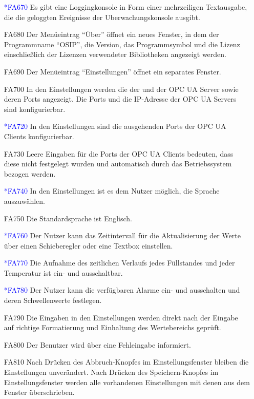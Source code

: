 \documentclass[parskip=full]{scrartcl}
\begin{document}
\begin{enumerate}
  \item[\textcolor{blue}{*FA670}] Es gibt eine Loggingkonsole in Form einer mehrzeiligen Textausgabe, die die geloggten Ereignisse der \gls{Uberwachungskonsole} ausgibt.
  \item[FA680] Der Menüeintrag "`Über"' öffnet ein neues Fenster, in dem der Programmname "`OSIP"', die Version, das Programmsymbol und die Lizenz einschließlich der Lizenzen verwendeter Bibliotheken angezeigt werden.
  \item[FA690] Der Menüeintrag "`Einstellungen"' öffnet ein separates Fenster.
  \item[FA700] In den Einstellungen werden die  der  und der \gls{OPC UA Server} sowie deren Ports angezeigt. Die Ports und die IP-Adresse
  der \glspl{OPC UA Server} sind konfigurierbar.
  \item[\textcolor{blue}{*FA720}] In den Einstellungen sind die ausgehenden Ports der \glspl{OPC UA Client} konfigurierbar.
  \item[FA730] Leere Eingaben für die Ports der \glspl{OPC UA Client} bedeuten, dass diese nicht festgelegt wurden und automatisch durch das Betriebssystem bezogen werden.
  \item[\textcolor{blue}{*FA740}] In den Einstellungen ist es dem Nutzer möglich, die Sprache auszuwählen.
  \item[FA750] Die Standardsprache ist Englisch.
  \item[\textcolor{blue}{*FA760}] Der Nutzer kann das Zeitintervall für die Aktualisierung der Werte über einen Schieberegler oder eine Textbox einstellen.
  \item[\textcolor{blue}{*FA770}] Die Aufnahme des zeitlichen Verlaufs jedes Füllstandes und jeder Temperatur ist ein- und ausschaltbar.
  \item[\textcolor{blue}{*FA780}] Der Nutzer kann die verfügbaren Alarme ein- und ausschalten und deren Schwellenwerte festlegen.
  \item[FA790] Die Eingaben in den Einstellungen werden direkt nach der Eingabe auf richtige Formatierung und Einhaltung des Wertebereichs gepr\"uft.
  \item[FA800] Der Benutzer wird über eine Fehleingabe informiert.
  \item[FA810] Nach Drücken des Abbruch-Knopfes im Einstellungsfenster bleiben die Einstellungen unverändert. Nach Drücken des Speichern-Knopfes im Einstellungsfenster werden alle vorhandenen
  Einstellungen mit denen aus dem Fenster überschrieben.

\end{enumerate}
\end{document}

